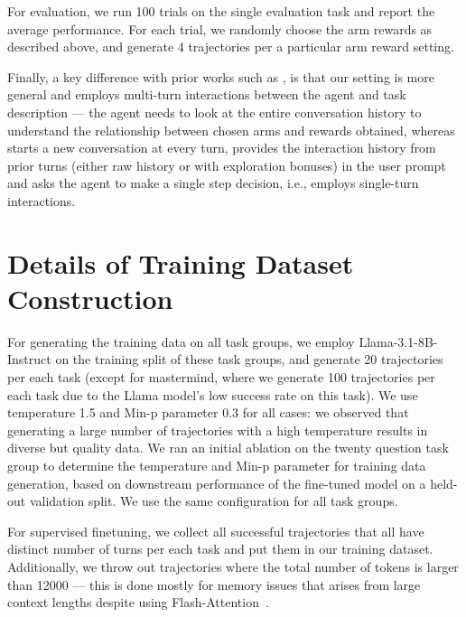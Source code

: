 For evaluation, we run 100 trials on the single evaluation task and report the average performance. For each trial, we randomly choose the arm rewards as described above, and generate 4 trajectories per a particular arm reward setting.

Finally, a key difference with prior works such as \citet{nie2024evolveevaluatingoptimizingllms}, is that our setting is more general and employs multi-turn interactions between the agent and task description --- the agent needs to look at the entire conversation history to understand the relationship between chosen arms and rewards obtained, whereas \citet{nie2024evolveevaluatingoptimizingllms} starts a new conversation at every turn, provides the interaction history from prior turns (either raw history or with exploration bonuses) in the user prompt and asks the agent to make a single step decision, i.e., employs single-turn interactions. 


\newpage

\section{Details of Training Dataset Construction}

For generating the training data on all task groups, we employ Llama-3.1-8B-Instruct on the training split of these task groups, and generate 20 trajectories per each task (except for mastermind, where we generate 100 trajectories per each task due to the Llama model's low success rate on this task). We use temperature 1.5 and Min-p parameter $0.3$ for all cases: we observed that generating a large number of trajectories with a high temperature results in diverse but quality data. We ran an initial ablation on the twenty question task group to determine the temperature and Min-p parameter for training data generation, based on downstream performance of the fine-tuned model on a held-out validation split. We use the same configuration for all task groups.

For supervised finetuning, we collect all successful trajectories that all have distinct number of turns per each task and put them in our training dataset. Additionally, we throw out trajectories where the total number of tokens is larger than 12000 --- this is done mostly for memory issues that arises from large context lengths despite using Flash-Attention~\citep{dao2022flashattention,dao2023flashattention2}. 

